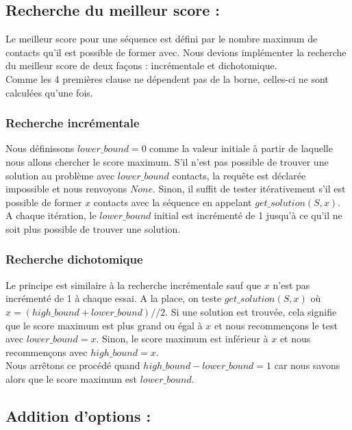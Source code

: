 \documentclass[utf8]{article}
\begin{document}
\subsection{Recherche du meilleur score :}
Le meilleur score pour une séquence est défini par le nombre maximum de contacts qu'il est possible de former avec.
Nous devions implémenter la recherche du meilleur score de deux façons : incrémentale et dichotomique.\\
Comme les 4 premières clause ne dépendent pas de la borne, celles-ci ne sont calculées qu'une fois.

\subsubsection{Recherche incrémentale}
Nous définissons $ lower\_bound = 0 $ comme la valeur initiale à partir de laquelle nous allons chercher le score maximum. S'il n'est pas possible de trouver une solution au problème avec $lower\_bound$ contacts, la requête est déclarée impossible et nous renvoyons $None$.
Sinon, il suffit de tester itérativement s'il est possible de former $x$ contacts avec la séquence en appelant $get\_solution(S, x)$. A chaque itération, le $lower\_bound$ initial est incrémenté de 1 jusqu'à ce qu'il ne soit plus possible de trouver une solution.

\subsubsection{Recherche dichotomique}

Le principe est similaire à la recherche incrémentale sauf que $x$ n'est pas incrémenté de 1 à chaque essai. A la place, on teste $get\_solution(S, x)$ où $x = (high\_bound + lower\_bound)//2$. Si une solution est trouvée, cela signifie que le score maximum est plus grand ou égal à $x$ et nous recommençons le test avec $lower\_bound = x$. Sinon, le score maximum est inférieur à $x$ et nous recommençons avec $high\_bound = x$. \\
Nous arrêtons ce procédé quand $high\_bound - lower\_bound = 1$ car nous savons alors que le score maximum est $lower\_bound$.

\subsection{Addition d'options :}
\end{document}
